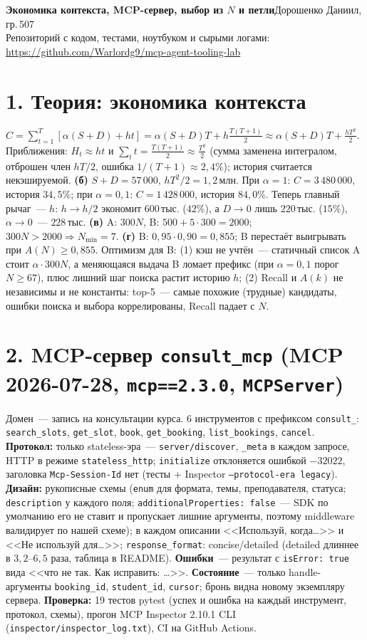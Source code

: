 \documentclass[10pt,a4paper]{article}
\newcommand{\code}[1]{\texttt{#1}}
\begin{document}
\sloppy

{\large\textbf{Экономика контекста, MCP-сервер, выбор из $N$ и петли}}\hfill Дорошенко Даниил, гр.\,507\\[1pt]
{\small Репозиторий с кодом, тестами, ноутбуком и сырыми логами: \url{https://github.com/Warlordg9/mcp-agent-tooling-lab}}

\section*{1. Теория: экономика контекста}
$C=\sum_{t=1}^{T}[\alpha(S+D)+ht]=\alpha(S+D)T+h\frac{T(T+1)}{2}\approx\alpha(S+D)T+\frac{hT^2}{2}$.
Приближения: $H_t\approx ht$ и $\sum_t t=\tfrac{T(T+1)}{2}\approx\tfrac{T^2}{2}$ (сумма заменена интегралом, отброшен член $hT/2$, ошибка $1/(T+1)\approx2{,}4\%$); история считается некэшируемой.
\textbf{(б)} $S{+}D=57\,000$, $hT^2/2=1{,}2$\,млн. При $\alpha=1$: $C=3\,480\,000$, история $34{,}5\%$; при $\alpha=0{,}1$: $C=1\,428\,000$, история $84{,}0\%$.
Теперь главный рычаг~--- $h$: $h\to h/2$ экономит $600$\,тыс. ($42\%$), а $D\to0$ лишь $220$\,тыс. ($15\%$), $\alpha\to0$~--- $228$\,тыс.
\textbf{(в)} A: $300N$, B: $500+5\cdot300=2000$; $300N>2000\Rightarrow N_{\min}=7$.
\textbf{(г)} B: $0{,}95\cdot0{,}90=0{,}855$; B перестаёт выигрывать при $A(N)\ge0{,}855$. Оптимизм для B: (1) кэш не учтён~--- статичный список A стоит $\alpha\cdot300N$, а меняющаяся выдача B ломает префикс (при $\alpha=0{,}1$ порог $N\ge67$), плюс лишний шаг поиска растит историю $h$; (2) Recall и $A(k)$ не независимы и не константы: top-5~--- самые похожие (трудные) кандидаты, ошибки поиска и выбора коррелированы, Recall падает с $N$.

\section*{2. MCP-сервер \code{consult\_mcp} (MCP 2026-07-28, \code{mcp==2.3.0}, \code{MCPServer})}
Домен~--- запись на консультации курса. 6 инструментов с префиксом \code{consult\_}: \code{search\_slots}, \code{get\_slot}, \code{book}, \code{get\_booking}, \code{list\_bookings}, \code{cancel}.
\textbf{Протокол:} только stateless-эра~--- \code{server/discover}, \code{\_meta} в каждом запросе, HTTP в режиме \code{stateless\_http}; \code{initialize} отклоняется ошибкой $-32022$, заголовка \code{Mcp-Session-Id} нет (тесты + Inspector \code{--protocol-era legacy}).
\textbf{Дизайн:} рукописные схемы (\code{enum} для формата, темы, преподавателя, статуса; \code{description} у каждого поля; \code{additionalProperties:\,false}~--- SDK по умолчанию его не ставит и пропускает лишние аргументы, поэтому middleware валидирует по нашей схеме); в каждом описании <<Используй, когда…>> и <<Не используй для…>>; \code{response\_format}: concise/detailed (detailed длиннее в $3{,}2$--$6{,}5$ раза, таблица в README).
\textbf{Ошибки}~--- результат с \code{isError:\,true} вида <<что не так. Как исправить: …>>. \textbf{Состояние}~--- только handle-аргументы \code{booking\_id}, \code{student\_id}, \code{cursor}; бронь видна новому экземпляру сервера.
\textbf{Проверка:} 19 тестов pytest (успех и ошибка на каждый инструмент, протокол, схемы), прогон MCP Inspector 2.10.1 CLI (\code{inspector/inspector\_log.txt}), CI на GitHub Actions.
\end{document}
